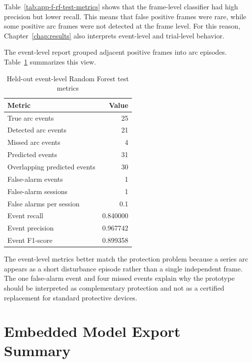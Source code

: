 Table~\ref{tab:app-f-rf-test-metrics} shows that the frame-level classifier had
high precision but lower recall. This means that false positive frames were
rare, while some positive arc frames were not detected at the frame level.
For this reason, Chapter~\ref{chap:results} also interprets event-level and
trial-level behavior.

The event-level report grouped adjacent positive frames into arc episodes.
Table~\ref{tab:app-f-event-metrics} summarizes this view.
\begin{table}[H]
  \centering
  \caption{Held-out event-level Random Forest test metrics}
  \label{tab:app-f-event-metrics}
  \begin{tabular}{lr}
    \toprule
    \textbf{Metric} & \textbf{Value} \\
    \midrule
    True arc events & 25 \\
    Detected arc events & 21 \\
    Missed arc events & 4 \\
    Predicted events & 31 \\
    Overlapping predicted events & 30 \\
    False-alarm events & 1 \\
    False-alarm sessions & 1 \\
    False alarms per session & 0.1 \\
    Event recall & 0.840000 \\
    Event precision & 0.967742 \\
    Event F1-score & 0.899358 \\
    \bottomrule
  \end{tabular}
\end{table}

The event-level metrics better match the protection problem because a series
arc appears as a short disturbance episode rather than a single independent
frame. The one false-alarm event and four missed events explain why the
prototype should be interpreted as complementary protection and not as a
certified replacement for standard protective devices.

\section{Embedded Model Export Summary}
\label{app:f-embedded-export-summary}

